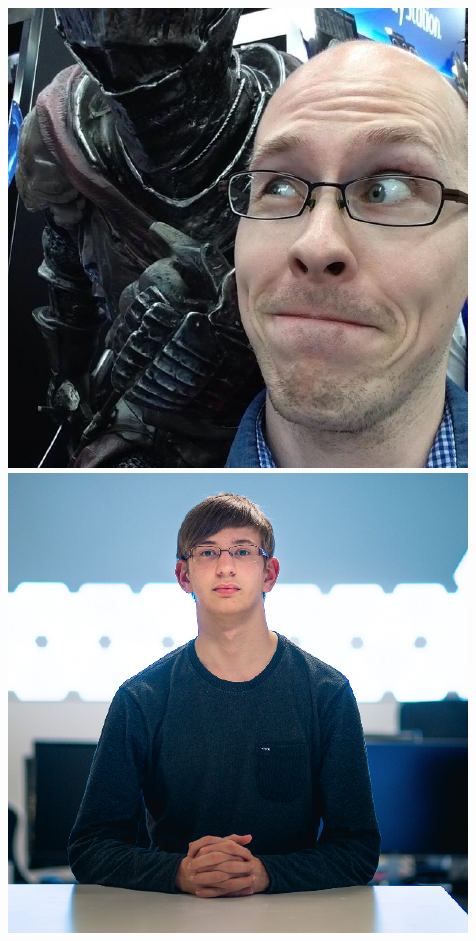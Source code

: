 \documentclass{beamer}
\begin{document}
\begin{frame}
\begin{columns}
\begin{columns}
\includegraphics[width=\textwidth]{Lee.jpg}
\includegraphics[width=\textwidth]{Ben.png}

\end{columns}
\end{columns}
\end{frame}
\end{document}
